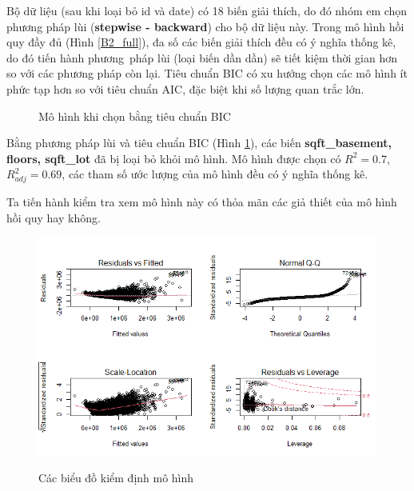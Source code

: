 Bộ dữ liệu (sau khi loại bỏ id và date) có 18 biến giải thích, do đó nhóm em chọn phương pháp lùi (\textbf{stepwise - backward}) cho bộ dữ liệu này. Trong mô hình hồi quy đầy đủ (Hình \ref{B2_full}), đa số các biến giải thích đều có ý nghĩa thống kê, do đó tiến hành phương~pháp lùi (loại biến dần dần) sẽ tiết kiệm thời gian hơn so với các phương pháp còn lại.  Tiêu chuẩn BIC có xu hướng chọn các mô hình ít phức tạp hơn so với tiêu chuẩn AIC, đặc biệt khi số lượng quan trắc lớn.

\begin{figure}[H]
	\centering
	\hfill
	\caption{Mô hình khi chọn bằng tiêu chuẩn BIC}
	\label{B2_BIC}
\end{figure}
 Bằng phương pháp lùi và tiêu chuẩn BIC (Hình \ref{B2_BIC}), các biến \textbf{sqft\_basement, floors, sqft\_lot} đã bị loại bỏ khỏi mô hình. Mô hình được chọn có $R^2=0.7$, $R^2_{adj}=0.69$, các tham số ước lượng của mô hình đều có ý nghĩa thống kê.
 
 Ta tiến hành kiểm tra xem mô hình này có thỏa mãn các giả thiết của mô hình hồi quy hay không.
 
 \begin{figure}[H]
 	\centering
 	{\includegraphics[width=.7\linewidth]{../Photo Of Result/B2_originalmodel}}
 	\caption{Các biểu đồ kiểm định mô hình}
 	\label{B2_check}
 \end{figure}
 
